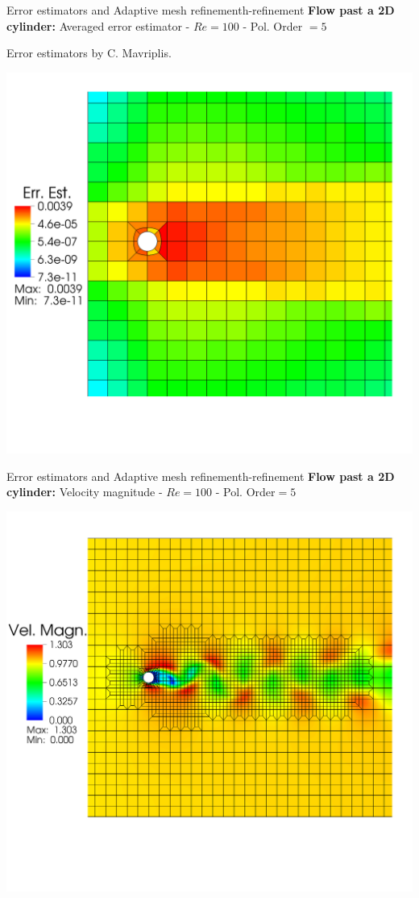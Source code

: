 \documentclass[usenames,dvipsnames,svgnames,9pt]{beamer}
\begin{document}
\begin{frame}{Error estimators and Adaptive mesh refinement}{h-refinement}
\textbf{Flow past a 2D cylinder:} Averaged error estimator - $Re=100$ - Pol. Order $= 5$

Error estimators by C. Mavriplis.

\centering
  \includegraphics[trim={0 14.5cm 0 7.2cm},clip, width=0.8\linewidth]{err_est} 
\end{frame}

\begin{frame}{Error estimators and Adaptive mesh refinement}{h-refinement}
\textbf{Flow past a 2D cylinder:} Velocity magnitude - $Re=100$ - Pol. Order$ = 5$

\centering
  \includegraphics[trim={0 18cm 3cm 10cm},clip, width=0.8\linewidth]{ref_cyl_velmagn} 
\end{frame}
\end{document}
